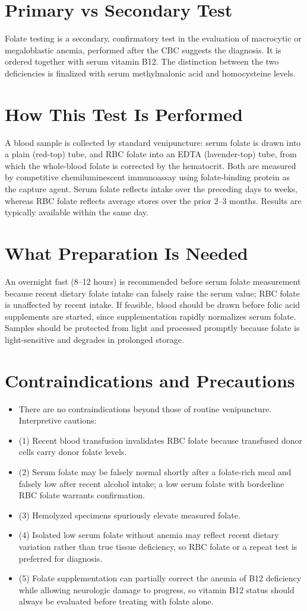 \section*{Primary vs Secondary Test}
Folate testing is a secondary, confirmatory test in the evaluation of macrocytic or megaloblastic anemia, performed after the CBC suggests the diagnosis. It is ordered together with serum vitamin B12. The distinction between the two deficiencies is finalized with serum methylmalonic acid and homocysteine levels.
\section*{How This Test Is Performed}
A blood sample is collected by standard venipuncture: serum folate is drawn into a plain (red-top) tube, and RBC folate into an EDTA (lavender-top) tube, from which the whole-blood folate is corrected by the hematocrit. Both are measured by competitive chemiluminescent immunoassay using folate-binding protein as the capture agent. Serum folate reflects intake over the preceding days to weeks, whereas RBC folate reflects average stores over the prior 2--3 months. Results are typically available within the same day.
\section*{What Preparation Is Needed}
An overnight fast (8--12 hours) is recommended before serum folate measurement because recent dietary folate intake can falsely raise the serum value; RBC folate is unaffected by recent intake. If feasible, blood should be drawn before folic acid supplements are started, since supplementation rapidly normalizes serum folate. Samples should be protected from light and processed promptly because folate is light-sensitive and degrades in prolonged storage.
\section*{Contraindications and Precautions}
\begin{itemize}
  \item There are no contraindications beyond those of routine venipuncture. Interpretive cautions:
  \item (1) Recent blood transfusion invalidates RBC folate because transfused donor cells carry donor folate levels.
  \item (2) Serum folate may be falsely normal shortly after a folate-rich meal and falsely low after recent alcohol intake; a low serum folate with borderline RBC folate warrants confirmation.
  \item (3) Hemolyzed specimens spuriously elevate measured folate.
  \item (4) Isolated low serum folate without anemia may reflect recent dietary variation rather than true tissue deficiency, so RBC folate or a repeat test is preferred for diagnosis.
  \item (5) Folate supplementation can partially correct the anemia of B12 deficiency while allowing neurologic damage to progress, so vitamin B12 status should always be evaluated before treating with folate alone.
\end{itemize}
